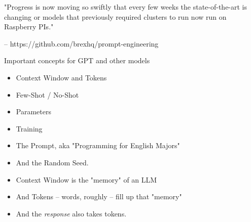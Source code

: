 \documentclass{beamer}
\begin{document}
\begin{frame}[plain]
\end{frame}

\begin{frame}
	"Progress is now moving so swiftly that every few weeks the state-of-the-art is changing or models that previously required clusters to run now run on Raspberry PIs."
	 
	 -- https://github.com/brexhq/prompt-engineering
\end{frame}

\begin{frame}{Important concepts for GPT and other models}
	\begin{itemize}
		\item Context Window and Tokens
		\pause
		\item Few-Shot / No-Shot
		\pause
		\item Parameters
		\pause
		\item Training
		\pause 
		\item The Prompt, aka "Programming for English Majors"
		\pause
		\item And the Random Seed.
	\end{itemize}
\end{frame}

\begin{frame}
	\begin{itemize}
		\item Context Window is the "memory" of an LLM
		\pause
		\item And Tokens -- words, roughly -- fill up that "memory"
		\pause
		\item And the \textit{response} also takes tokens.
	\end{itemize}
\end{frame}
\end{document}
